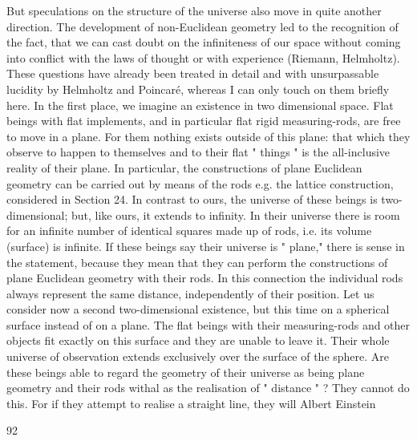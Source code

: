 \documentclass{article}
\begin{document}
But speculations on the structure of the universe also move in quite another direction.
The development of non-Euclidean geometry led to the recognition of the fact, that we can
cast doubt on the infiniteness of our space without coming into conflict with the laws of
thought or with experience (Riemann, Helmholtz). These questions have already been
treated in detail and with unsurpassable lucidity by Helmholtz and Poincaré, whereas I can
only touch on them briefly here.
In the first place, we imagine an existence in two dimensional space. Flat beings with flat
implements, and in particular flat rigid measuring-rods, are free to move in a plane. For
them nothing exists outside of this plane: that which they observe to happen to themselves
and to their flat " things " is the all-inclusive reality of their plane. In particular, the
constructions of plane Euclidean geometry can be carried out by means of the rods e.g. the
lattice construction, considered in Section 24. In contrast to ours, the universe of these
beings is two-dimensional; but, like ours, it extends to infinity. In their universe there is
room for an infinite number of identical squares made up of rods, i.e. its volume (surface) is
infinite. If these beings say their universe is " plane," there is sense in the statement,
because they mean that they can perform the constructions of plane Euclidean geometry
with their rods. In this connection the individual rods always represent the same distance,
independently of their position.
Let us consider now a second two-dimensional existence, but this time on a spherical
surface instead of on a plane. The flat beings with their measuring-rods and other objects fit
exactly on this surface and they are unable to leave it. Their whole universe of observation
extends exclusively over the surface of the sphere. Are these beings able to regard the
geometry of their universe as being plane geometry and their rods withal as the realisation
of " distance " ? They cannot do this. For if they attempt to realise a straight line, they will
Albert Einstein

92
\end{document}
